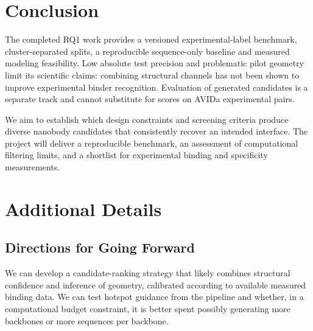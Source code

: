 \documentclass[11pt, logo, nonumbering]{preprint}
\begin{document}
\section{Conclusion}
\label{sec:conclusion}
The completed RQ1 work provides a versioned experimental-label benchmark,
cluster-separated splits, a reproducible sequence-only baseline and measured
modeling feasibility. Low absolute test precision and problematic pilot geometry
limit its scientific claims: combining structural channels has not been shown
to improve experimental binder recognition. Evaluation of generated candidates
is a separate track and cannot substitute for scores on AVIDa experimental pairs.

We aim to establish which design constraints and screening criteria produce diverse nanobody candidates that consistently recover an intended interface. The project will deliver a reproducible benchmark, an assessment of computational filtering limits, and a shortlist for experimental binding and specificity measurements.

\section{Additional Details}
\label{sec:additional}
\subsection{Directions for Going Forward}
We can develop a candidate-ranking strategy that likely combines structural confidence and inference of geometry, calibrated according to available measured binding data. We can test hotspot guidance from the pipeline and whether, in a computational budget constraint, it is better spent possibly generating more backbones or more sequences per backbone. 

\end{document}
